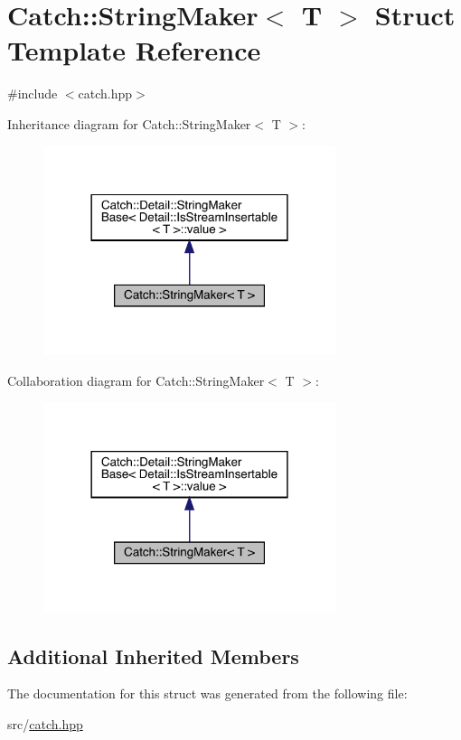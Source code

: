\hypertarget{struct_catch_1_1_string_maker}{}\section{Catch\+:\+:String\+Maker$<$ T $>$ Struct Template Reference}
\label{struct_catch_1_1_string_maker}


{\ttfamily \#include $<$catch.\+hpp$>$}



Inheritance diagram for Catch\+:\+:String\+Maker$<$ T $>$\+:
\nopagebreak
\begin{figure}[H]
\begin{center}
\leavevmode
\includegraphics[width=242pt]{struct_catch_1_1_string_maker__inherit__graph}
\end{center}
\end{figure}


Collaboration diagram for Catch\+:\+:String\+Maker$<$ T $>$\+:
\nopagebreak
\begin{figure}[H]
\begin{center}
\leavevmode
\includegraphics[width=242pt]{struct_catch_1_1_string_maker__coll__graph}
\end{center}
\end{figure}
\subsection*{Additional Inherited Members}


The documentation for this struct was generated from the following file\+:\begin{DoxyCompactItemize}
\item 
src/\hyperlink{catch_8hpp}{catch.\+hpp}\end{DoxyCompactItemize}
